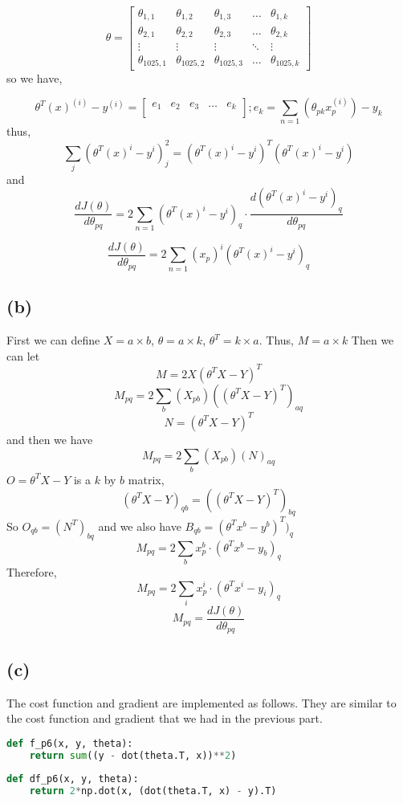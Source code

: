 \documentclass{article}
\begin{document}
\[
\theta
=
\begin{bmatrix}
\theta_{1,1} & \theta_{1,2} & \theta_{1,3} & \dots  & \theta_{1,k} \\
\theta_{2,1} & \theta_{2,2} & \theta_{2,3} & \dots  & \theta_{2,k} \\
\vdots & \vdots & \vdots & \ddots & \vdots \\
\theta_{1025,1} & \theta_{1025,2} & \theta_{1025,3} & \dots  & \theta_{1025,k}
\end{bmatrix}
\]
so we have,

\[
\theta^T(x)^{(i)} - y^{(i)}
=
\begin{bmatrix}
e_{1}& e_{2} & e_{3} & \dots  & e_{k} \\
\end{bmatrix}; 
e_{k}
= \sum_{n=1} (\theta_{pk}x_{p}^{(i)}) - y_{k}
\]
thus,
\[
\sum_{j} (\theta^T(x)^i - y^i)^2_{j} = (\theta^T(x)^i - y^i)^T(\theta^T(x)^i - y^i)
\]
and
\[ \frac{dJ(\theta)}{d\theta_{pq}} = 2\sum_{n=1} (\theta^T(x)^i - y^i)_{q}\cdot\frac{d(\theta^T(x)^i - y^i)_{q}}{d\theta_{pq}}\]

\[ \frac{dJ(\theta)}{d\theta_{pq}} = 2\sum_{n=1}(x_{p})^i (\theta^T(x)^i - y^i)_{q}\]

\subsection*{(b)}
First we can define $X=a\times b$, $\theta=a\times k$,  $\theta^T=k\times a$. Thus, $M=a\times k$
Then we can let \[ M = 2X(\theta^TX - Y)^T\] 
\[M_{pq} =2\sum_{b}(X_{pb})((\theta^TX - Y)^T)_{aq} \]
\[N = (\theta^TX - Y)^T\]
and then we have
\[M_{pq} =2\sum_{b}(X_{pb})(N)_{aq} \]
$O = \theta^TX - Y$ is a $k$ by $b$ matrix, 
\[(\theta^TX - Y)_{qb} = ((\theta^TX - Y)^T)_{bq}\]
So $O_{qb} = (N^T)_{bq}$ and we also have $B_{qb} = (\theta^Tx^b - y^b)^T)_{q}$
\[ M_{pq} = 2\sum_{b}x_{p}^b\cdot (\theta^Tx^b - y_b)_{q}\]
Therefore,
\[ M_{pq} = 2\sum_{i}x_{p}^i\cdot (\theta^Tx^i - y_i)_{q}\]
\[ M_{pq} = \frac{dJ(\theta)}{d\theta_{pq}}\]
\subsection*{(c)}
The cost function and gradient are implemented as follows. They are similar to the cost function and gradient that we had in the previous part.
\Large\begin{lstlisting}[basicstyle=\ttfamily,language=Python]
def f_p6(x, y, theta):
    return sum((y - dot(theta.T, x))**2)
    
def df_p6(x, y, theta):
    return 2*np.dot(x, (dot(theta.T, x) - y).T)
\end{lstlisting}
\end{document}
